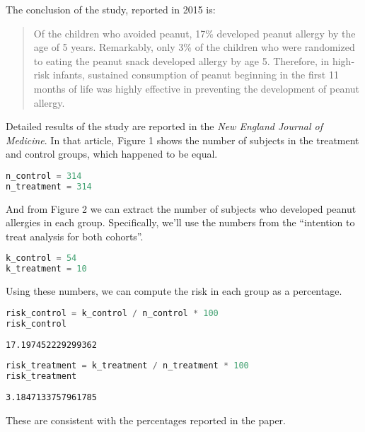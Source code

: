 The conclusion of the study, reported in 2015 is:

\begin{quote}
Of the children who avoided peanut, 17\% developed peanut allergy by the
age of 5 years. Remarkably, only 3\% of the children who were randomized
to eating the peanut snack developed allergy by age 5. Therefore, in
high-risk infants, sustained consumption of peanut beginning in the
first 11 months of life was highly effective in preventing the
development of peanut allergy.
\end{quote}

Detailed results of the study are reported in the \emph{New England
Journal of Medicine}. In that article, Figure 1 shows the number of
subjects in the treatment and control groups, which happened to be
equal.


\begin{lstlisting}[language=Python,style=source]
n_control = 314
n_treatment = 314
\end{lstlisting}

And from Figure 2 we can extract the number of subjects who developed
peanut allergies in each group. Specifically, we'll use the numbers from
the ``intention to treat analysis for both cohorts''.

\begin{lstlisting}[language=Python,style=source]
k_control = 54
k_treatment = 10
\end{lstlisting}

Using these numbers, we can compute the risk in each group as a
percentage.

\begin{lstlisting}[language=Python,style=source]
risk_control = k_control / n_control * 100
risk_control
\end{lstlisting}

\begin{lstlisting}[style=output]
17.197452229299362
\end{lstlisting}

\begin{lstlisting}[language=Python,style=source]
risk_treatment = k_treatment / n_treatment * 100
risk_treatment
\end{lstlisting}

\begin{lstlisting}[style=output]
3.1847133757961785
\end{lstlisting}

These are consistent with the percentages reported in the paper.

